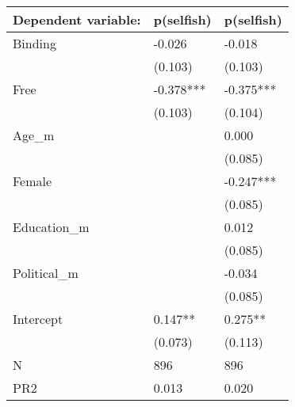 \begin{tabular}{lll}
\toprule
Dependent variable: & p(selfish) & p(selfish) \\
\midrule
Binding     &     -0.026 &     -0.018 \\
            &    (0.103) &    (0.103) \\
Free        &  -0.378*** &  -0.375*** \\
            &    (0.103) &    (0.104) \\
Age\_m       &            &      0.000 \\
            &            &    (0.085) \\
Female      &            &  -0.247*** \\
            &            &    (0.085) \\
Education\_m &            &      0.012 \\
            &            &    (0.085) \\
Political\_m &            &     -0.034 \\
            &            &    (0.085) \\
Intercept   &    0.147** &    0.275** \\
            &    (0.073) &    (0.113) \\
N           &        896 &        896 \\
PR2         &      0.013 &      0.020 \\
\bottomrule
\end{tabular}
